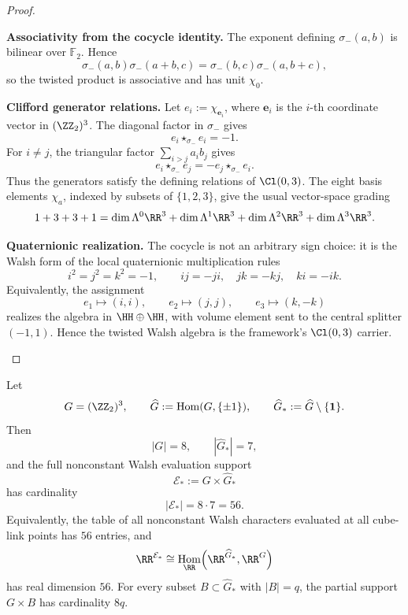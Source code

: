 \documentclass[11pt]{article}
\DeclareMathOperator{\Hom}{Hom}
\begin{document}
\begin{proof}

\begin{proofsteps}
\item \textbf{Associativity from the cocycle identity.}
The exponent defining \(\sigma_-(a,b)\) is bilinear over \(\mathbb F_2\).  Hence
\[
  \sigma_-(a,b)\sigma_-(a+b,c)
  =
  \sigma_-(b,c)\sigma_-(a,b+c),
\]
so the twisted product is associative and has unit \(\chi_0\).

\item \textbf{Clifford generator relations.}
Let
\(e_i:=\chi_{\mathbf e_i}\), where \(\mathbf e_i\) is the \(i\)-th coordinate
vector in \((\ZZ_2)^3\).  The diagonal factor in \(\sigma_-\) gives
\[
    e_i\star_{\sigma_-} e_i=-1.
\]
For \(i\ne j\), the triangular factor \(\sum_{i>j}a_i b_j\) gives
\[
    e_i\star_{\sigma_-} e_j=-e_j\star_{\sigma_-}e_i.
\]
Thus the generators satisfy the defining relations of \(\Cl(0,3)\).  The eight
basis elements \(\chi_a\), indexed by subsets of \(\{1,2,3\}\), give the usual
vector-space grading
\[
    1+3+3+1
    =\dim\Lambda^0\RR^3+\dim\Lambda^1\RR^3+\dim\Lambda^2\RR^3+
      \dim\Lambda^3\RR^3.
\]

\item \textbf{Quaternionic realization.}
The cocycle is not an arbitrary sign choice: it is the Walsh form of the local
quaternionic multiplication rules
\[
    i^2=j^2=k^2=-1,
    \qquad
    ij=-ji,
    \quad jk=-kj,
    \quad ki=-ik.
\]
Equivalently, the assignment
\[
    e_1\mapsto(i,i),\qquad e_2\mapsto(j,j),\qquad e_3\mapsto(k,-k)
\]
realizes the algebra in \(\HH\oplus\HH\), with volume element sent to the central
splitter \((-1,1)\).  Hence the twisted Walsh algebra is the framework's
\(\Cl(0,3)\) carrier.
\end{proofsteps}
\end{proof}

\begin{corollary}
\label{p1:cor:walsh-evaluation-support-56}
Let
\[
    G=(\ZZ_2)^3,
    \qquad
    \widehat G:=\Hom(G,\{\pm1\}),
    \qquad
    \widehat G_*:=\widehat G\setminus\{\mathbf1\}.
\]
Then
\[
    |G|=8,
    \qquad
    |\widehat G_*|=7,
\]
and the full nonconstant Walsh evaluation support
\[
    \mathcal E_*:=G\times\widehat G_*
\]
has cardinality
\[
    |\mathcal E_*|=8\cdot7=56.
\]
Equivalently, the table of all nonconstant Walsh characters evaluated at all
cube-link points has \(56\) entries, and
\[
    \RR^{\mathcal E_*}
    \cong
    \Hom_\RR\!\left(\RR^{\widehat G_*},\RR^G\right)
\]
has real dimension \(56\).  For every subset
\(B\subset\widehat G_*\) with \(|B|=q\), the partial support
\(G\times B\) has cardinality \(8q\).
\end{corollary}
\end{document}
